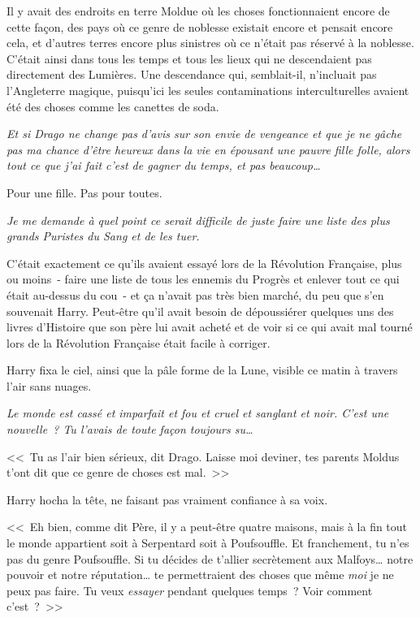 Il y avait des endroits en terre Moldue où les choses fonctionnaient encore de cette façon, des pays où ce genre de noblesse existait encore et pensait encore cela, et d'autres terres encore plus sinistres où ce n'était pas réservé à la noblesse. C'était ainsi dans tous les temps et tous les lieux qui ne descendaient pas directement des Lumières. Une descendance qui, semblait-il, n'incluait pas l'Angleterre magique, puisqu'ici les seules contaminations interculturelles avaient été des choses comme les canettes de soda.

\emph{Et si Drago ne change pas d'avis sur son envie de vengeance et que je ne gâche pas ma chance d'être heureux dans la vie en épousant une pauvre fille folle, alors tout ce que j'ai fait c'est de gagner du temps, et pas beaucoup…}

Pour une fille. Pas pour toutes.

\emph{Je me demande à quel point ce serait difficile de juste faire une liste des plus grands Puristes du Sang et de les tuer.}

C'était exactement ce qu'ils avaient essayé lors de la Révolution Française, plus ou moins~- faire une liste de tous les ennemis du Progrès et enlever tout ce qui était au-dessus du cou~- et ça n'avait pas très bien marché, du peu que s'en souvenait Harry. Peut-être qu'il avait besoin de dépoussiérer quelques uns des livres d'Histoire que son père lui avait acheté et de voir si ce qui avait mal tourné lors de la Révolution Française était facile à corriger.

Harry fixa le ciel, ainsi que la pâle forme de la Lune, visible ce matin à travers l'air sans nuages.

\emph{Le monde est cassé et imparfait et fou et cruel et sanglant et noir. C'est une nouvelle~? Tu l'avais de toute façon toujours su…}

<<~Tu as l'air bien sérieux, dit Drago. Laisse moi deviner, tes parents Moldus t'ont dit que ce genre de choses est mal.~>>

Harry hocha la tête, ne faisant pas vraiment confiance à sa voix.

<<~Eh bien, comme dit Père, il y a peut-être quatre maisons, mais à la fin tout le monde appartient soit à Serpentard soit à Poufsouffle. Et franchement, tu n'es pas du genre Poufsouffle. Si tu décides de t'allier secrètement aux Malfoys… notre pouvoir et notre réputation… te permettraient des choses que même \emph{moi} je ne peux pas faire. Tu veux \emph{essayer} pendant quelques temps~? Voir comment c'est~?~>>

